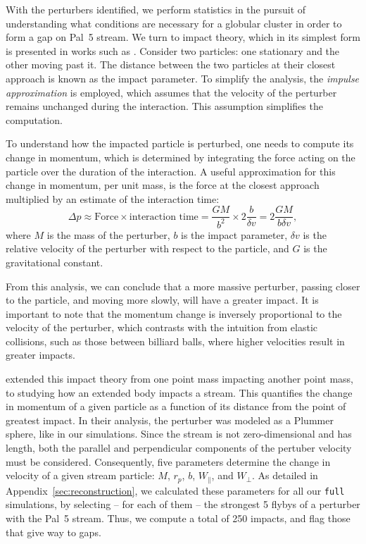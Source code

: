 \documentclass[draft]{aa}
\begin{document}
    With the perturbers identified, we perform statistics in the pursuit of understanding what conditions are necessary for a globular cluster  in order to form a gap on Pal~5 stream. We turn to impact theory, which in its simplest form is presented in works such as \citet{2008gady.book.....B}. Consider two particles: one stationary and the other moving past it. The distance between the two particles at their closest approach is known as the impact parameter. To simplify the analysis, the \textit{impulse approximation} is employed, which assumes that the velocity of the perturber remains unchanged during the interaction. This assumption simplifies the computation.

    To understand how the impacted particle is perturbed, one needs to compute its change in momentum, which is determined by integrating the force acting on the particle over the duration of the interaction. A useful approximation for this change in momentum, per unit mass, is the force at the closest approach multiplied by an estimate of the interaction time:
    \begin{equation} \label{eq:change_in_momentum} \Delta p \approx \text{Force} \times \text{interaction time} = \frac{GM}{b^2} \times 2\frac{b}{\delta v} = 2\frac{GM}{b \delta v}, \end{equation}where $M$ is the mass of the perturber, $b$ is the impact parameter, $\delta v$ is the relative velocity of the perturber with respect to the particle, and $G$ is the gravitational constant. 


    From this analysis, we can conclude that a more massive perturber, passing closer to the particle, and moving more slowly, will have a greater impact. It is important to note that the momentum change is inversely proportional to the velocity of the perturber, which contrasts with the intuition from elastic collisions, such as those between billiard balls, where higher velocities result in greater impacts.

    \citet{2015MNRAS.450.1136E} extended this impact theory from one point mass impacting another point mass, to studying how an extended body impacts a stream. This quantifies the change in momentum of a given particle as a function of its distance from the point of greatest impact. In their analysis, the perturber was modeled as a Plummer sphere, like in our simulations. Since the stream is not zero-dimensional and has length, both the parallel and perpendicular components of the pertuber velocity must be considered. Consequently, five parameters determine the change in velocity of a given stream particle: $M$, $r_p$, $b$, $W_\parallel$, and $W_\perp$. As detailed in Appendix~\ref{sec:reconstruction}, we calculated these parameters for all our \texttt{full} simulations, by selecting -- for each of them --  the strongest 5 flybys of a perturber with the Pal~5 stream. Thus, we compute a total of  250 impacts, and flag those that give way to gaps. 
\end{document}
